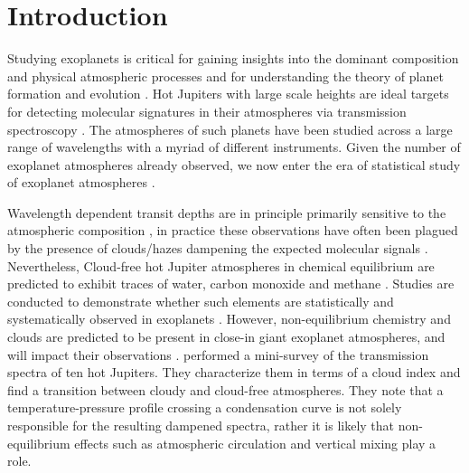 \section{Introduction}

\label{P1:sec:introduction}

Studying exoplanets is critical for gaining insights into the dominant composition and physical atmospheric processes and for understanding the theory of planet formation and evolution \citep{Seager2010, Crossfield2015, Deming2017}. Hot Jupiters with large scale heights are ideal targets for detecting molecular signatures in their atmospheres via transmission spectroscopy \citep{Seager2000, Brown2001}. The atmospheres of such planets have been studied across a large range of wavelengths with a myriad of different instruments. Given the number of exoplanet atmospheres already observed, we now enter the era of statistical study of exoplanet atmospheres \citep[e.g.,][]{Triaud2014a, Beatty2014, Gao2020, Keating2019, Garhart2020, Baxter2020, Fu2017, Tsiaras2018, Wallack2019}.

Wavelength dependent transit depths are in principle primarily sensitive to the atmospheric composition \citep{Seager2000}, in practice these observations have often been plagued by the presence of clouds/hazes dampening the expected molecular signals \citep[e.g.,][]{Fortney2005, Sing2016, Barstow2017}. Nevertheless, Cloud-free hot Jupiter atmospheres in chemical equilibrium are predicted to exhibit traces of water, carbon monoxide and methane \citep{Seager2000, Fortney2005, Fortney2010}. Studies are conducted to demonstrate whether such elements are statistically and systematically observed in exoplanets \citep{Tsai2018}. However, non-equilibrium chemistry and clouds are predicted to be present in close-in giant exoplanet atmospheres, and will impact their observations \citep[e.g.,][]{Agundez2012, Drummond2016, Steinrueck2019}. \citet{Sing2016} performed a mini-survey of the transmission spectra of ten hot Jupiters. They characterize them in terms of a cloud index and find a transition between cloudy and cloud-free atmospheres. They note that a temperature-pressure profile crossing a condensation curve is not solely responsible for the resulting dampened spectra, rather it is likely that non-equilibrium effects such as atmospheric circulation and vertical mixing play a role.

